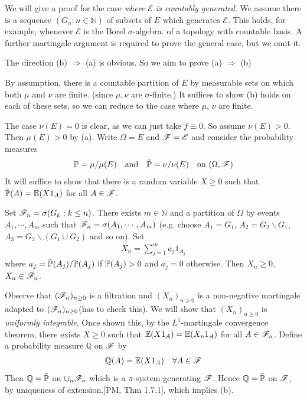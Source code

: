 \documentclass[12pt,a4paper]{report}
\newenvironment{proof}
{\begin{changemargin}{1cm}{0.5cm} 
	}%
	{\end{changemargin}
}
\begin{document}
We will give a proof for the case \emph{where $\mathscr{E}$ is countably generated}. We assume there is a sequence $(G_n : n \in \mathbb{N})$ of subsets of $E$ which generates $\mathscr{E}$. This holds, for example, whenever $\mathscr{E}$ is the Borel $\sigma$-algebra. of a topology with countable basis. A further martingale argument is required to prove the general case, but we omit it.
\begin{proof}
\pf The direction (b) $\Rightarrow$ (a) is obvious. So we aim to prove (a) $\Rightarrow$ (b)

\quad By assumption, there is a countable partition of $E$ by measurable sets on which both $\mu$ and $\nu$ are finite. (since $\mu,\nu$ are $\sigma$-finite.) It suffices to show (b) holds on each of these sets, so we can reduce to the case where $\mu$, $\nu$ are finite.

\quad The case $\nu(E) =0$ is clear, as we can just take $f\equiv 0$. So assume $\nu(E) >0$. Then $\mu(E)>0$ by (a). Write $\Omega = E$ and $\mathscr{F} = \mathscr{E}$ and consider the probability measures
\begin{align*}
\mathbb{P} = \mu / \mu(E) \quad \text{and} \quad \tilde{\mathbb{P}} = \nu/\nu(E) \quad \text{on } (\Omega, \mathscr{F})
\end{align*}
It will suffice to show that there is a random variable $X \geq 0$ such that $\tilde{\mathbb{P}}(A) = \mathbb{E}(X 1_A)$ for all $A\in \mathscr{F}$.

\quad Set $\mathscr{F}_n = \sigma(G_k : k\leq n)$. There exists $m \in \mathbb{N}$ and a partition of $\Omega$ by events $A_1, \cdots, A_m$ such that $\mathscr{F}_n = \sigma (A_1, \cdots, A_m)$ (e.g. choose $A_1 = G_1$, $A_2 = G_2 \backslash G_1$, $A_3 = G_3\backslash (G_1 \cup G_2)$ and so on). Set 
\begin{align*}
X_n = \sum_{j=1}^m a_{j} 1_{A_j}
\end{align*}
where $a_j = \tilde{\mathbb{P}}(A_j) / \mathbb{P}(A_j)$ if $\mathbb{P}(A_j)>0$ and $a_j =0$ otherwise. Then $X_n \geq 0$, $X_n \in \mathscr{F}_n$.

\quad Observe that $(\mathscr{F}_n)_{n\geq 0}$ is a filtration and $(X_n)_{n\geq 0}$ is a non-negative martingale adapted to $(\mathscr{F}_n)_{n\geq 0}$(has to check this). We will show that $(X_n)_{n\geq 0}$ is \emph{uniformly integrable}. Once shown this, by the $L^1$-martingale convergence theorem, there exists $X\geq 0$ such that $\mathbb{E}(X 1_A) = \mathbb{E}(X_n 1_A)$ for all $A \in \mathscr{F}_n$. Define a probability measure $\mathbb{Q}$ on $\mathscr{F}$ by
\begin{align*}
\mathbb{Q}(A) = \mathbb{E}(X 1_A) \quad \forall A \in \mathscr{F}
\end{align*}
Then $\mathbb{Q} = \tilde{\mathbb{P}}$ on $\cup_n \mathscr{F}_n$ which is a $\pi$-system generating $\mathscr{F}$. Hence $\mathbb{Q} = \tilde{\mathbb{P}}$ on $\mathscr{F}$, by uniqueness of extension.[PM, Thm 1.7.1], which implies (b).


\end{proof}
\end{document}
